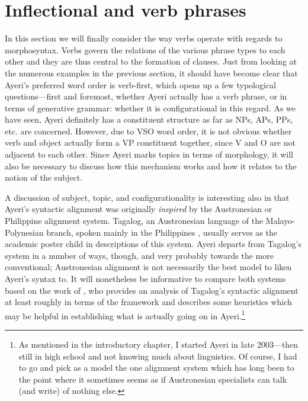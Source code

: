 \section{Inflectional and verb phrases}
\label{sec:ips-vps}

In this section we will finally consider the way verbs operate with regards to
morphosyntax. Verbs govern the relations of the various phrase types to each
other and they are thus central to the formation of clauses. Just from looking
at the numerous examples in the previous section, it should have become clear
that Ayeri's preferred word order is verb-first, which opens up a few
typological questions---first and foremost, whether Ayeri actually has a verb
phrase, or in terms of generative grammar: whether it is configurational in
this regard. As we have seen, Ayeri definitely has a constituent structure as
far as NPs, APs, PPs, etc. are concerned. However, due to VSO word order, it is
not obvious whether verb and object actually form a VP constituent together,
since V and O are not adjacent to each other. Since Ayeri marks topics in terms
of morphology, it will also be necessary to discuss how this mechanism works
and how it relates to the notion of the subject.

A discussion of subject, topic, and configurationality is interesting also
in that Ayeri's syntactic alignment was originally \emph{inspired} by the
Austronesian or Philippine alignment system. Tagalog, an Austronesian language
of the Malayo-Polynesian branch, spoken mainly in the Philippines
\parencites{glottolog:tgl}{schachterotanes1972}, usually serves as the
academic poster child in descriptions of this system. Ayeri departs from
Tagalog's system in a number of ways, though, and very probably towards the
more conventional; Austronesian alignment is not necessarily the best model to
liken Ayeri's syntax to. It will nonetheless be informative to compare both
systems based on the work of \textcites{kroeger1991}{kroeger1993}, who provides
an analysis of Tagalog's syntactic alignment at least roughly in terms of the
\Lfg{} framework and describes some heuristics which may be helpful in
establishing what is actually going on in Ayeri.\footnote{As mentioned in the
introductory chapter, I started Ayeri in late 2003---then still in high school
and not knowing much about linguistics. Of course, I had to go and pick as a
model the one alignment system which has long been  to the
point where it  {sometimes seems as if Austronesian
specialists can talk (and write) of nothing else}.}

